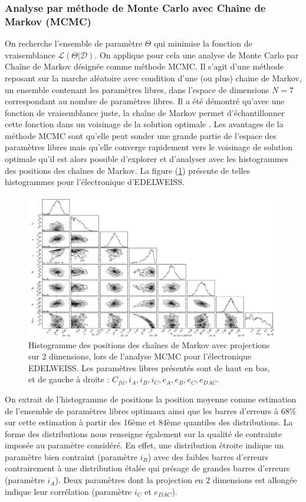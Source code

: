 \subsubsection{Analyse par méthode de Monte Carlo avec Chaîne de Markov (MCMC)}


On recherche l'ensemble de paramètre $\Theta$ qui minimise la fonction de vraisemblance $\mathcal{L}(\Theta | \mathcal{D})$. On applique pour cela une analyse de Monte Carlo par Chaîne de Markov désignée comme méthode MCMC. Il s'agit d'une méthode reposant sur la marche aléatoire avec condition d'une (ou plus) chaine de Markov, un ensemble contenant les paramètres libres, dans l'espace de dimensions $N=7$ correspondant au nombre de paramètres libres. Il a été démontré \cite{julien} qu'avec une fonction de vraisemblance juste, la chaîne de Markov permet d'échantillonner cette fonction dans un voisinage de la solution optimale . Les avantages de la méthode MCMC sont qu'elle peut sonder une grande partie de l'espace des paramètres libres mais qu'elle converge rapidement vers le voisinage de solution optimale qu'il est alors possible d'explorer et d'analyser avec les histogrammes des positions des chaînes de Markov. La figure (\ref{triangle-mcmc}) présente de telles histogrammes pour l'électronique d'EDELWEISS.
\begin{figure}
\includegraphics[width=\textwidth]{Images/triangle_fin.pdf}
\caption{Histogramme des positions des chaînes de Markov avec projections sur 2 dimensions, lors de l'analyse MCMC pour l'électronique EDELWEISS. Les paramètres libres présentés sont de haut en bas, et de gauche à droite : $C_{fil}, i_A, i_B, i_C, e_A, e_B, e_C, e_{DAC}$.}
\label{triangle-mcmc}
\end{figure}
On extrait de l'histogramme de positions la position moyenne comme estimation de l'ensemble de paramètres libres optimaux ainsi que les barres d'erreurs à 68\% sur cette estimation à partir des 16ème et 84ème quantiles des distributions. La forme des distributions nous renseigne également sur la qualité de contrainte imposée au paramètre considéré. En effet, une distribution étroite indique un paramètre bien contraint (paramètre $i_B$) avec des faibles barres d'erreurs contrairement à une distribution étalée qui présage de grandes barres d'erreurs (paramètre $i_A$). Deux paramètres dont la projection en 2 dimensions est allongée indique leur corrélation (paramètre $i_C$ et $e_{DAC}$). 

